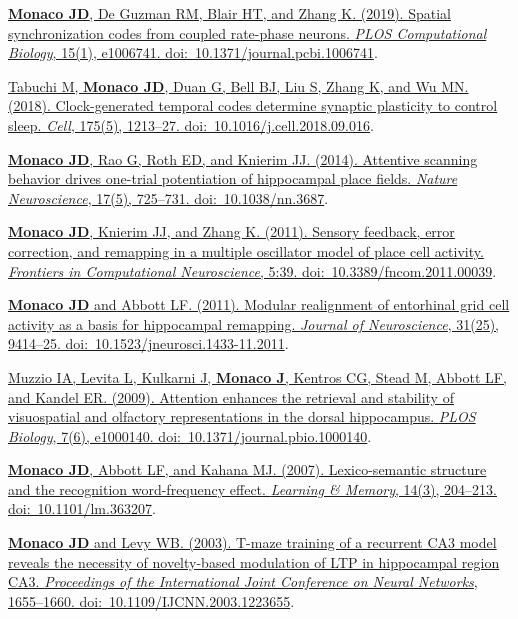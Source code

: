 \documentclass[10pt]{article}
\begin{document}
\begin{description}
\item \href{https://doi.org/10.1371/journal.pcbi.1006741}{\textbf{Monaco JD}, De Guzman RM, Blair HT, and Zhang K. (2019). Spatial synchronization codes from coupled rate-phase neurons. \emph{PLOS Computational Biology}, 15(1), e1006741. doi:~10.1371/journal.pcbi.1006741}.
\item \href{https://www.cell.com/cell/fulltext/S0092-8674(18)31228-5}{Tabuchi M, \textbf{Monaco JD}, Duan G, Bell BJ, Liu S, Zhang K, and Wu MN. (2018). Clock-generated temporal codes determine synaptic plasticity to control sleep. \emph{Cell}, 175(5), 1213--27. doi:~10.1016/j.cell.2018.09.016}.
\item \href{http://dx.doi.org/10.1038/nn.3687}{\textbf{Monaco JD}, Rao G, Roth ED, and Knierim JJ. (2014). Attentive scanning behavior drives one-trial potentiation of hippocampal place fields. \emph{Nature Neuroscience}, 17(5), 725--731. doi:~10.1038/nn.3687}.
\item \href{http://dx.doi.org/10.3389/fncom.2011.00039}{\textbf{Monaco JD}, Knierim JJ, and Zhang K. (2011). Sensory feedback, error correction, and remapping in a multiple oscillator model of place cell activity. \emph{Frontiers in Computational Neuroscience}, 5:39. doi:~10.3389/fncom.2011.00039}.
\item \href{http://dx.doi.org/10.1523/JNEUROSCI.1433-11.2011}{\textbf{Monaco JD} and Abbott LF. (2011). Modular realignment of entorhinal grid cell activity as a basis for hippocampal remapping. \emph{Journal of Neuroscience}, 31(25), 9414--25. doi:~10.1523/jneurosci.1433-11.2011}.
\item \href{http://dx.doi.org/10.1371/journal.pbio.1000140}{Muzzio IA, Levita L, Kulkarni J, \textbf{Monaco J}, Kentros CG, Stead M, Abbott LF, and Kandel ER. (2009). Attention enhances the retrieval and stability of visuospatial and olfactory representations in the dorsal hippocampus. \emph{PLOS Biology}, 7(6), e1000140. doi:~10.1371/journal.pbio.1000140}.
\item \href{http://dx.doi.org/10.1101/lm.363207}{\textbf{Monaco JD}, Abbott LF, and Kahana MJ. (2007). Lexico-semantic structure and the recognition word-frequency effect. \emph{Learning \& Memory}, 14(3), 204--213. doi:~10.1101/lm.363207}.
\item \href{http://dx.doi.org/10.1109/IJCNN.2003.1223655}{\textbf{Monaco JD} and Levy WB. (2003). T-maze training of a recurrent CA3 model reveals the necessity of novelty-based modulation of LTP in hippocampal region CA3. \emph{Proceedings of the  International Joint Conference on Neural Networks}, 1655--1660. doi:~10.1109/IJCNN.2003.1223655}.
\end{description}
\end{document}
